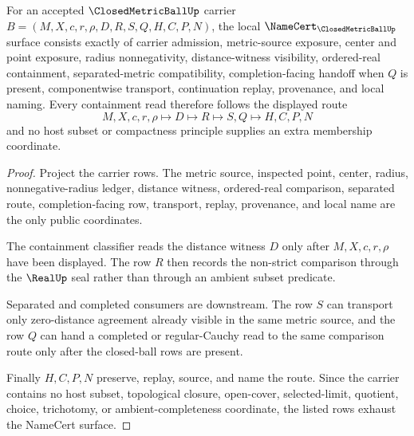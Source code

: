 \begin{theorem}
\label{thm:closed-metric-ball-namecert-obligations}
For an accepted $\ClosedMetricBallUp$ carrier $B=(M,X,c,r,\rho,D,R,S,Q,H,C,P,N)$, the local $\NameCert_{\ClosedMetricBallUp}$ surface consists exactly of carrier admission, metric-source exposure, center and point exposure, radius nonnegativity, distance-witness visibility, ordered-real containment, separated-metric compatibility, completion-facing handoff when $Q$ is present, componentwise transport, continuation replay, provenance, and local naming. Every containment read therefore follows the displayed route
$$
M,X,c,r,\rho\longmapsto D\longmapsto R\longmapsto S,Q\longmapsto H,C,P,N
$$
and no host subset or compactness principle supplies an extra membership coordinate.
\end{theorem}
\begin{proof}
Project the carrier rows. The metric source, inspected point, center, radius, nonnegative-radius ledger, distance witness, ordered-real comparison, separated route, completion-facing row, transport, replay, provenance, and local name are the only public coordinates.

The containment classifier reads the distance witness $D$ only after $M,X,c,r,\rho$ have been displayed. The row $R$ then records the non-strict comparison through the $\RealUp$ seal rather than through an ambient subset predicate.

Separated and completed consumers are downstream. The row $S$ can transport only zero-distance agreement already visible in the same metric source, and the row $Q$ can hand a completed or regular-Cauchy read to the same comparison route only after the closed-ball rows are present.

Finally $H,C,P,N$ preserve, replay, source, and name the route. Since the carrier contains no host subset, topological closure, open-cover, selected-limit, quotient, choice, trichotomy, or ambient-completeness coordinate, the listed rows exhaust the NameCert surface.
\end{proof}

